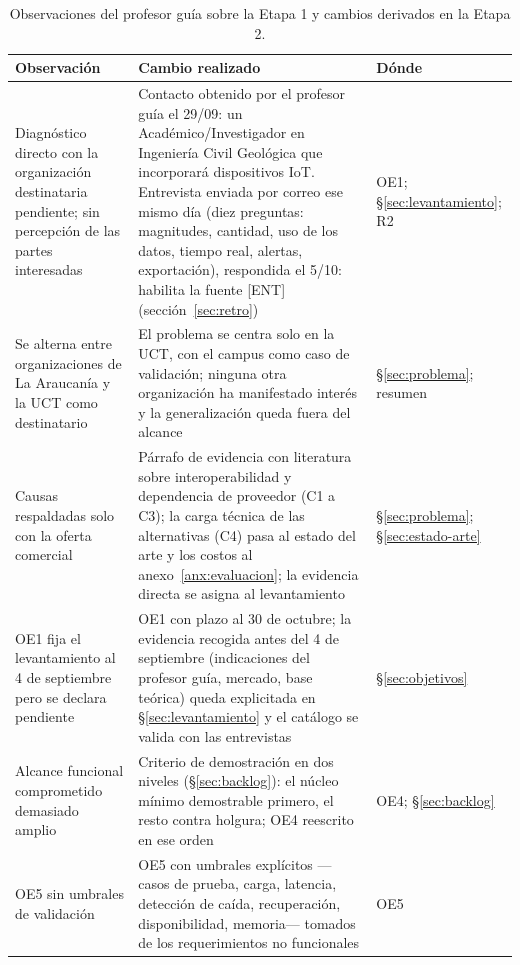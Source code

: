 \begin{table}[H]
\centering\footnotesize
\begin{tablaseg}
\begin{tabular}{@{}L{4.1cm}L{6.0cm}L{2.5cm}@{}}
\toprule
\textbf{Observación} & \textbf{Cambio realizado} & \textbf{Dónde} \\
\midrule
Diagnóstico directo con la organización destinataria pendiente; sin percepción de las partes interesadas &
Contacto obtenido por el profesor guía el 29/09: un Académico/Investigador en Ingeniería Civil Geológica que incorporará dispositivos IoT. Entrevista enviada por correo ese mismo día (diez preguntas: magnitudes, cantidad, uso de los datos, tiempo real, alertas, exportación), respondida el 5/10: habilita la fuente [ENT] (sección~\ref{sec:retro}) &
OE1; §\ref{sec:levantamiento}; R2 \\
Se alterna entre organizaciones de La Araucanía y la UCT como destinatario &
El problema se centra solo en la UCT, con el campus como caso de validación; ninguna otra organización ha manifestado interés y la generalización queda fuera del alcance &
§\ref{sec:problema}; resumen \\
Causas respaldadas solo con la oferta comercial &
Párrafo de evidencia con literatura sobre interoperabilidad y dependencia de proveedor (C1 a C3); la carga técnica de las alternativas (C4) pasa al estado del arte y los costos al anexo~\ref{anx:evaluacion}; la evidencia directa se asigna al levantamiento &
§\ref{sec:problema}; §\ref{sec:estado-arte} \\
OE1 fija el levantamiento al 4 de septiembre pero se declara pendiente &
OE1 con plazo al 30 de octubre; la evidencia recogida antes del 4 de septiembre (indicaciones del profesor guía, mercado, base teórica) queda explicitada en §\ref{sec:levantamiento} y el catálogo se valida con las entrevistas &
§\ref{sec:objetivos} \\
Alcance funcional comprometido demasiado amplio &
Criterio de demostración en dos niveles (§\ref{sec:backlog}): el núcleo mínimo demostrable primero, el resto contra holgura; OE4 reescrito en ese orden &
OE4; §\ref{sec:backlog} \\
OE5 sin umbrales de validación &
OE5 con umbrales explícitos —casos de prueba, carga, latencia, detección de caída, recuperación, disponibilidad, memoria— tomados de los requerimientos no funcionales &
OE5 \\
\bottomrule
\end{tabular}
\end{tablaseg}
\caption{Observaciones del profesor guía sobre la Etapa 1 y cambios derivados en la Etapa 2.}
\label{tab:retro}
\end{table}

